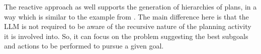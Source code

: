 The reactive approach as well supports the generation of hierarchies of plans,
in a way which is similar to the example from .
%
%
The main difference here is that the \ac{LLM} is not required
to be aware of the recursive nature of the planning activity it is involved into.
%
So,
it can focus on the problem suggesting the best subgoals and actions to be performed to pursue a given goal.




